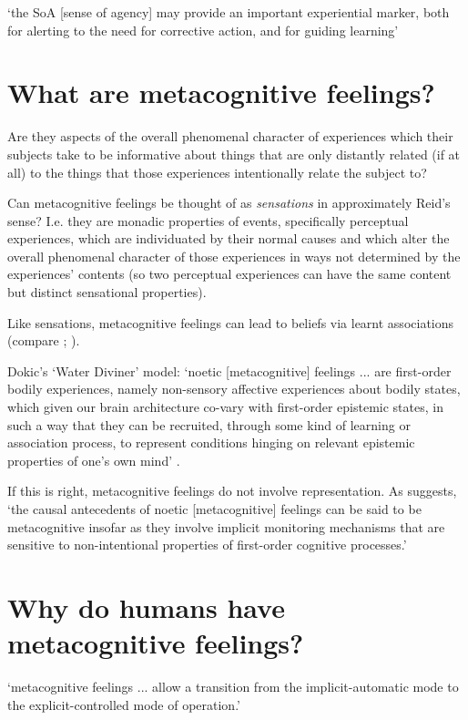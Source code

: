 \documentclass[12pt]{extarticle}
\begin{document}
\begin{multicols*}{3}
‘the SoA [sense of agency] may provide an important experiential marker, both for alerting to
the need for corrective action, and for guiding learning’
\citep[p.~11]{sidarus:2017_how}


\section{What are metacognitive feelings?}
Are they aspects of the overall phenomenal character of experiences
which their subjects take to be informative about things that are only
distantly related (if at all) to the things that those experiences
intentionally relate the subject to?

Can metacognitive feelings  be thought of as \emph{sensations} in approximately Reid’s sense? I.e. they are
monadic properties of events, specifically perceptual experiences, which are individuated by
their normal causes and which alter the overall phenomenal character of those experiences in
ways not determined by the experiences’ contents (so two perceptual experiences can have the
same content but distinct sensational properties).

Like sensations, metacognitive feelings  can lead to beliefs via learnt associations (compare \citealp[Essay~II, Chap.~16, p.~228]{Reid:1785cj};
\citealp[Chap.~VI sect.~III, pp.~164–5]{Reid:1785nz}).


Dokic’s ‘Water Diviner’ model:
‘noetic [metacognitive] feelings ... are first-order bodily experiences, namely non-sensory affective experiences about bodily states, which given our brain architecture co-vary with first-order epistemic states, in such a way that they can be recruited, through some kind of learning or association process, to represent conditions hinging on relevant epistemic properties of one’s own mind’
\citep[p.~317]{dokic:2012_seeds}.

If this is right, metacognitive feelings do not involve representation. As \citet[p.~310]{dokic:2012_seeds}suggests, ‘the causal antecedents of noetic [metacognitive] feelings
can be said to be metacognitive insofar as they involve implicit monitoring mechanisms that
are sensitive to non-intentional properties of first-order cognitive processes.’


\section{Why do humans have metacognitive feelings?}

‘metacognitive feelings ... allow a transition from the implicit-automatic mode to the
explicit-controlled mode of operation.’
\citep[p.~150]{koriat:2000_feeling}





\footnotesize


\end{multicols*}
\end{document}
